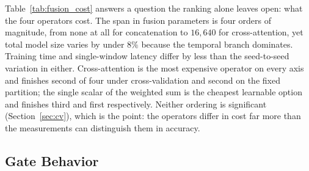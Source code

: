 \documentclass[journal]{IEEEtran}
\begin{document}
\begin{table}[!htbp]
  \centering
  \caption{\textbf{[Fixed partition, 5 seeds]}~ Cost of the four fusion operators. Fusion parameters counts only the operator; total counts the whole model. Epochs and training time are means over the five fixed-partition seeds, on one NVIDIA RTX 4060 Laptop GPU. Latency is the median over a single window, measured on the trip-instance graph.}
  \label{tab:fusion_cost}
  \renewcommand{\arraystretch}{1.15}
\end{table}

Table~\ref{tab:fusion_cost} answers a question the ranking alone leaves open: what the four operators cost. The span in fusion parameters is four orders of magnitude, from none at all for concatenation to $16{,}640$ for cross-attention, yet total model size varies by under $8\%$ because the temporal branch dominates. Training time and single-window latency differ by less than the seed-to-seed variation in either. Cross-attention is the most expensive operator on every axis and finishes second of four under cross-validation and second on the fixed partition; the single scalar of the weighted sum is the cheapest learnable option and finishes third and first respectively. Neither ordering is significant (Section~\ref{sec:cv}), which is the point: the operators differ in cost far more than the measurements can distinguish them in accuracy.

\subsection{Gate Behavior}
\label{sec:gate_behaviour}
\end{document}
